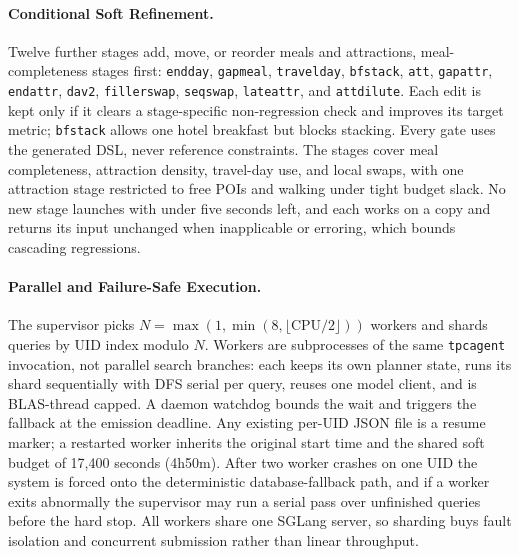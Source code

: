 \documentclass{article}
\begin{document}
\paragraph{Conditional Soft Refinement.}
Twelve further stages add, move, or reorder meals and attractions,
meal-completeness stages first: \texttt{endday}, \texttt{gapmeal}, \texttt{travelday},
\texttt{bfstack}, \texttt{att}, \texttt{gapattr}, \texttt{endattr},
\texttt{dav2}, \texttt{fillerswap}, \texttt{seqswap}, \texttt{lateattr},
and \texttt{attdilute}. Each edit is kept only if it clears a stage-specific non-regression check
and improves its target metric; \texttt{bfstack} allows one hotel breakfast
but blocks stacking. Every gate uses the generated DSL, never reference
constraints. The stages cover meal completeness, attraction density,
travel-day use, and local swaps, with one attraction stage restricted to
free POIs and walking under tight budget slack. No new stage launches with under five seconds left, and each works on
a copy and returns its input unchanged when inapplicable or erroring, which
bounds cascading regressions.
 
\paragraph{Parallel and Failure-Safe Execution.}
The supervisor picks $N=\max(1,\min(8,\lfloor\mathrm{CPU}/2\rfloor))$
workers and shards queries by UID index modulo $N$. Workers are
subprocesses of the same \texttt{tpcagent} invocation, not parallel search
branches: each keeps its own planner state, runs its shard sequentially
with DFS serial per query, reuses one model client, and is BLAS-thread
capped. A daemon watchdog bounds the
wait and triggers the fallback at the emission deadline. Any existing
per-UID JSON file is a resume marker; a restarted worker inherits the
original start time and the shared soft budget of 17,400 seconds (4h50m).
After two worker crashes on one UID the system is forced onto the
deterministic database-fallback path, and if a worker exits abnormally the
supervisor may run a serial pass over unfinished queries before the hard
stop. All workers share one SGLang server, so sharding buys fault isolation
and concurrent submission rather than linear throughput.
 
\end{document}
